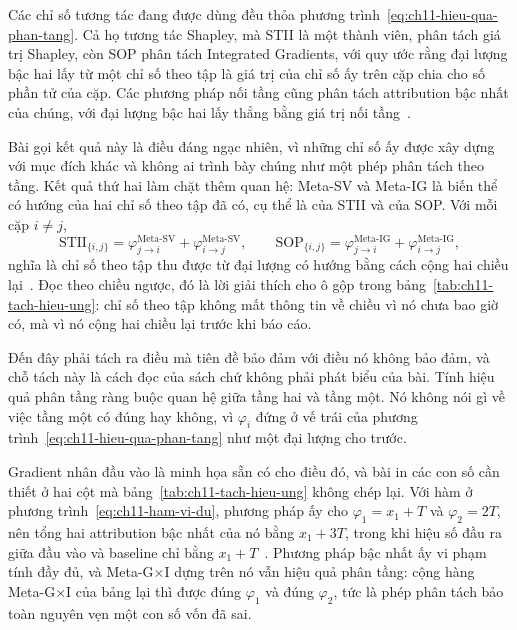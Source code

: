 \begin{theorem}
  \label{thm:ch11-phan-tang-san-co}
  Các chỉ số tương tác đang được dùng đều thỏa
  phương trình~\ref{eq:ch11-hieu-qua-phan-tang}. Cả họ tương tác Shapley, mà
  STII là một thành viên, phân tách giá trị Shapley, còn SOP phân tách
  Integrated Gradients, với quy ước rằng
  đại lượng bậc hai lấy từ một chỉ số theo tập là giá trị của chỉ số ấy trên
  cặp chia cho số phần tử của cặp. Các phương pháp nối tầng cũng phân tách
  attribution bậc nhất của chúng, với đại lượng bậc hai lấy thẳng bằng giá trị
  nối tầng~\autocite{p23metagame}.
\end{theorem}

Bài gọi kết quả này là điều đáng ngạc nhiên, vì những chỉ số ấy được xây dựng
với mục đích khác và không ai trình bày chúng như một phép phân tách theo tầng.
Kết quả thứ hai làm chặt thêm quan hệ: Meta-SV và Meta-IG là biến thể có hướng
của hai chỉ số theo tập đã có, cụ thể là của STII và của SOP. Với mỗi cặp
$i \neq j$,
%
\begin{equation}
  \label{eq:ch11-doi-xung-hoa}
  \text{STII}_{\{i,j\}}
    = \varphi^{\text{Meta-SV}}_{j \to i} + \varphi^{\text{Meta-SV}}_{i \to j},
  \qquad
  \text{SOP}_{\{i,j\}}
    = \varphi^{\text{Meta-IG}}_{j \to i} + \varphi^{\text{Meta-IG}}_{i \to j},
\end{equation}
%
nghĩa là chỉ số theo tập thu được từ đại lượng có hướng bằng cách cộng hai
chiều lại~\autocite{p23metagame}. Đọc theo chiều ngược, đó là lời giải thích
cho ô gộp trong bảng~\ref{tab:ch11-tach-hieu-ung}: chỉ số theo tập không mất
thông tin về chiều vì nó chưa bao giờ có, mà vì nó cộng hai chiều lại trước khi
báo cáo.

Đến đây phải tách ra điều mà tiên đề bảo đảm với điều nó không bảo đảm, và chỗ
tách này là cách đọc của sách chứ không phải phát biểu của bài. Tính hiệu quả
phân tầng ràng buộc quan hệ giữa tầng hai và tầng một. Nó không nói gì về việc
tầng một có đúng hay không, vì $\varphi_i$ đứng ở vế trái của
phương trình~\ref{eq:ch11-hieu-qua-phan-tang} như một đại lượng cho trước.

Gradient nhân đầu vào là minh họa sẵn có cho điều đó, và bài in các con số cần
thiết ở hai cột mà bảng~\ref{tab:ch11-tach-hieu-ung} không chép lại. Với hàm ở
phương trình~\ref{eq:ch11-ham-vi-du}, phương pháp ấy cho
$\varphi_1 = x_1 + T$ và $\varphi_2 = 2T$, nên tổng hai attribution bậc nhất
của nó bằng $x_1 + 3T$, trong khi hiệu số đầu ra giữa đầu vào và baseline chỉ
bằng $x_1 + T$~\autocite{p23metagame}. Phương pháp bậc nhất ấy vi phạm tính đầy
đủ, và Meta-G$\times$I dựng trên nó vẫn hiệu quả phân tầng: cộng hàng
Meta-G$\times$I của bảng lại thì được đúng $\varphi_1$ và đúng $\varphi_2$, tức
là phép phân tách bảo toàn nguyên vẹn một con số vốn đã sai.

